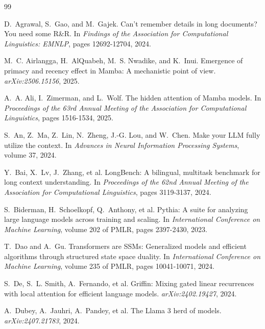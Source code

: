 \documentclass{article}
\begin{document}
{
\small
\begin{thebibliography}{99}

D.~Agrawal, S.~Gao, and M.~Gajek.
\newblock Can't remember details in long documents? You need some R\&R.
\newblock In \emph{Findings of the Association for Computational Linguistics: EMNLP}, pages 12692-12704, 2024.

M.~C. Airlangga, H.~AlQuabeh, M.~S. Nwadike, and K.~Inui.
\newblock Emergence of primacy and recency effect in Mamba: A mechanistic point of view.
\newblock \emph{arXiv:2506.15156}, 2025.

A.~A. Ali, I.~Zimerman, and L.~Wolf.
\newblock The hidden attention of Mamba models.
\newblock In \emph{Proceedings of the 63rd Annual Meeting of the Association for Computational Linguistics}, pages 1516-1534, 2025.

S.~An, Z.~Ma, Z.~Lin, N.~Zheng, J.-G. Lou, and W.~Chen.
\newblock Make your LLM fully utilize the context.
\newblock In \emph{Advances in Neural Information Processing Systems}, volume 37, 2024.

Y.~Bai, X.~Lv, J.~Zhang, et al.
\newblock LongBench: A bilingual, multitask benchmark for long context understanding.
\newblock In \emph{Proceedings of the 62nd Annual Meeting of the Association for Computational Linguistics}, pages 3119-3137, 2024.

S.~Biderman, H.~Schoelkopf, Q.~Anthony, et al.
\newblock Pythia: A suite for analyzing large language models across training and scaling.
\newblock In \emph{International Conference on Machine Learning}, volume 202 of PMLR, pages 2397-2430, 2023.

T.~Dao and A.~Gu.
\newblock Transformers are SSMs: Generalized models and efficient algorithms through structured state space duality.
\newblock In \emph{International Conference on Machine Learning}, volume 235 of PMLR, pages 10041-10071, 2024.

S.~De, S.~L. Smith, A.~Fernando, et al.
\newblock Griffin: Mixing gated linear recurrences with local attention for efficient language models.
\newblock \emph{arXiv:2402.19427}, 2024.

A.~Dubey, A.~Jauhri, A.~Pandey, et al.
\newblock The Llama 3 herd of models.
\newblock \emph{arXiv:2407.21783}, 2024.


\end{thebibliography}}
\end{document}
